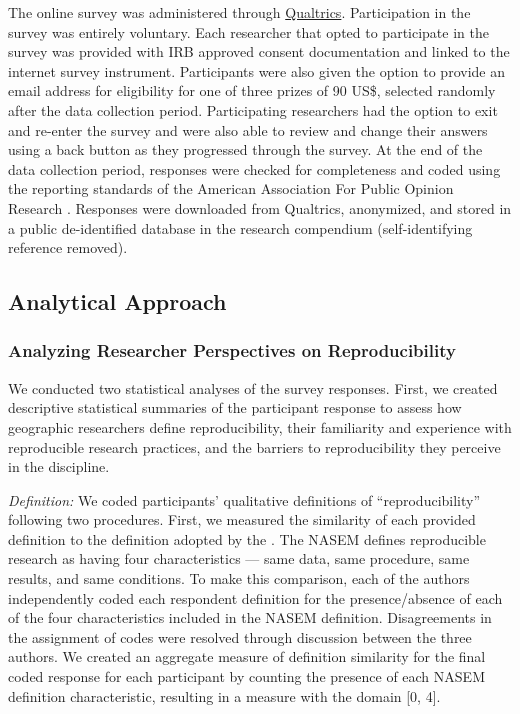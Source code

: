 \documentclass[]{interact}
\theoremstyle{plain}%
\theoremstyle{definition}
\theoremstyle{remark}
\begin{document}
The online survey was administered through \href{https://www.qualtrics.com/}{Qualtrics}. 
Participation in the survey was entirely voluntary. 
Each researcher that opted to participate in the survey was provided with IRB approved consent documentation and linked to the internet survey instrument. 
Participants were also given the option to provide an email address for eligibility for one of three  prizes of 90 US\$, selected randomly after the data collection period.
Participating researchers had the option to exit and re-enter the survey and were also able to review and change their answers using a back button as they progressed through the survey.
At the end of the data collection period, responses were checked for completeness and coded using the reporting standards of the American Association For Public Opinion Research \citep{aaporstandards}.
Responses were downloaded from Qualtrics, anonymized, and stored in a public de-identified database in the research compendium (self-identifying reference removed).

\subsection*{Analytical Approach}

\subsubsection*{Analyzing Researcher Perspectives on Reproducibility}
\noindent We conducted two statistical analyses of the survey responses.
First, we created descriptive statistical summaries of the participant response to assess how geographic researchers define reproducibility, their familiarity and experience with reproducible research practices, and the barriers to reproducibility they perceive in the discipline.

\textit{Definition:} 
We coded participants' qualitative definitions of ``reproducibility'' following two procedures.
First, we measured the similarity of each provided definition to the definition adopted by the \citet{NASEM2019}. 
The NASEM defines reproducible research as having four characteristics --- same data, same procedure, same results, and same conditions.
To make this comparison, each of the authors independently coded each respondent definition for the presence/absence of each of the four characteristics included in the NASEM definition.
Disagreements in the assignment of codes were resolved through discussion between the three authors.
We created an aggregate measure of definition similarity for the final coded response for each participant by counting the presence of each NASEM definition characteristic, resulting in a measure with the domain [0, 4].
\end{document}
